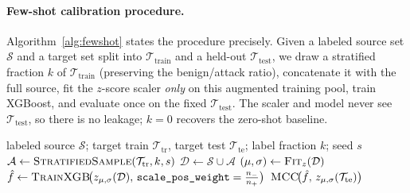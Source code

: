 \documentclass[preprint,12pt,authoryear]{elsarticle}
\begin{document}
\paragraph{Few-shot calibration procedure.} Algorithm~\ref{alg:fewshot} states the
procedure precisely. Given a labeled source set $\mathcal{S}$ and a target set split
into $\mathcal{T}_{\text{train}}$ and a held-out $\mathcal{T}_{\text{test}}$, we draw
a stratified fraction $k$ of $\mathcal{T}_{\text{train}}$ (preserving the
benign/attack ratio), concatenate it with the full source, fit the $z$-score scaler
\emph{only} on this augmented training pool, train XGBoost, and evaluate once on the
fixed $\mathcal{T}_{\text{test}}$. The scaler and model never see
$\mathcal{T}_{\text{test}}$, so there is no leakage; $k=0$ recovers the zero-shot
baseline.

\begin{algorithm}[h]
\caption{Few-shot cross-network calibration}
\label{alg:fewshot}
\begin{algorithmic}[1]
\Require labeled source $\mathcal{S}$; target train $\mathcal{T}_{\text{tr}}$,
target test $\mathcal{T}_{\text{te}}$; label fraction $k$; seed $s$
\State $\mathcal{A} \gets \textsc{StratifiedSample}(\mathcal{T}_{\text{tr}}, k, s)$
\State $\mathcal{D} \gets \mathcal{S} \cup \mathcal{A}$
\State $(\mu,\sigma) \gets \textsc{Fit}_{z}(\mathcal{D})$
\State $\hat{f} \gets \textsc{TrainXGB}\!\big(z_{\mu,\sigma}(\mathcal{D}),\,
\texttt{scale\_pos\_weight}=\tfrac{n_-}{n_+}\big)$
\State \Return $\textsc{MCC}\!\big(\hat{f},\, z_{\mu,\sigma}(\mathcal{T}_{\text{te}})\big)$
\end{algorithmic}
\end{algorithm}
\end{document}
